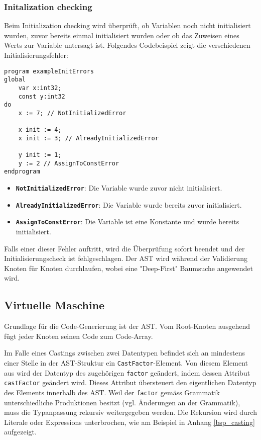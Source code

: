 \documentclass[10pt, a4paper, twocolumn]{article} %
\begin{document}
\subsubsection*{Initalization checking}
Beim Initialization checking wird überprüft, ob Variablen noch nicht initialisiert wurden, zuvor bereits einmal initialisiert wurden oder ob das Zuweisen eines Werts zur Variable untersagt ist.
Folgendes Codebeispiel zeigt die verschiedenen Initialisierungsfehler:
\begin{lstlisting}
program exampleInitErrors
global
    var x:int32;
    const y:int32
do
    x := 7; // NotInitializedError

    x init := 4;
    x init := 3; // AlreadyInitializedError

    y init := 1;
    y := 2 // AssignToConstError
endprogram
\end{lstlisting}

\begin{itemize}
    \item \texttt{\textbf{NotInitializedError}}: Die Variable wurde zuvor nicht initialisiert.
    \item \texttt{\textbf{AlreadyInitializedError}}: Die Variable wurde bereits zuvor initialisiert.
    \item \texttt{\textbf{AssignToConstError}}: Die Variable ist eine Konstante und wurde bereits initialisiert.
\end{itemize}

Falls einer dieser Fehler auftritt, wird die Überprüfung sofort beendet und der Initialisierungscheck ist fehlgeschlagen.
Der AST wird während der Validierung Knoten für Knoten durchlaufen, wobei eine "Deep-First" Baumsuche angewendet wird.

\subsection{Virtuelle Maschine}
Grundlage für die Code-Generierung ist der AST.
Vom Root-Knoten ausgehend fügt jeder Knoten seinen Code zum Code-Array.

Im Falle eines Castings zwischen zwei Datentypen befindet sich an mindestens einer Stelle in der AST-Struktur ein \texttt{CastFactor}-Element.
Von diesem Element aus wird der Datentyp des zugehörigen \texttt{factor} geändert, indem dessen Attribut \texttt{castFactor} geändert wird.
Dieses Attribut übersteuert den eigentlichen Datentyp des Elements innerhalb des AST.
Weil der \texttt{factor} gemäss Grammatik unterschiedliche Produktionen besitzt (vgl. Änderungen an der Grammatik), muss die Typanpassung rekursiv weitergegeben werden.
Die Rekursion wird durch Literale oder Expressions unterbrochen, wie am Beispiel in Anhang \ref{bsp_casting} aufgezeigt.
\end{document}
